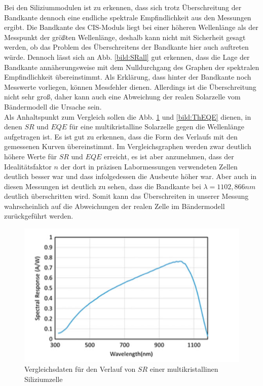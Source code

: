 \clearpage

Bei den Siliziummodulen ist zu erkennen, dass sich trotz 
Überschreitung der Bandkante dennoch eine endliche spektrale Empfindlichkeit aus den Messungen ergibt. 
Die Bandkante des CIS-Moduls liegt bei einer höheren Wellenlänge als der Messpunkt der größten Wellenlänge, deshalb kann nicht mit 
Sicherheit gesagt werden, ob das Problem des Überschreitens der Bandkante hier auch auftreten würde. Dennoch lässt sich an Abb. 
\ref{bild:SRall} gut erkennen, dass die Lage der Bandkante annäherungsweise mit dem Nulldurchgang des Graphen der spektralen Empfindlichkeit
übereinstimmt. Als Erklärung, dass hinter der Bandkante noch Messwerte vorliegen, können Messfehler dienen. Allerdings ist die 
Überschreitung nicht sehr groß, daher kann auch eine Abweichung der realen Solarzelle vom Bändermodell die Ursache sein. \\


Als Anhaltspunkt zum Vergleich sollen die Abb. \ref{bild:ThSR} und \ref{bild:ThEQE} dienen, in denen $SR$ und $EQE$ für eine multikristalline Solarzelle 
gegen die Wellenlänge aufgetragen ist. Es ist gut zu erkennen, dass die Form des Verlaufs mit den gemessenen Kurven übereinstimmt. Im 
Vergleichsgraphen werden zwar deutlich höhere Werte für $SR$ und $EQE$ erreicht, es ist aber anzunehmen, dass der Idealitätsfaktor $n$ 
der dort in präzisen Labormessungen verwendeten Zellen deutlich besser war und dass infolgedessen die Ausbeute höher war.
Aber auch in diesen Messungen ist deutlich zu sehen, dass die Bandkante bei $\lambda = 1102,866 nm$ deutlich überschritten wird. Somit
kann das Überschreiten in unserer Messung wahrscheinlich auf die Abweichungen der realen Zelle im Bändermodell zurückgeführt werden.

\begin{figure}[ht]
    \centering
    \includegraphics[scale=0.75]{Bilder/TheorieSR.png}
    \caption{Vergleichsdaten für den Verlauf von $SR$ einer multikristallinen Siliziumzelle \protect \footnotemark}
    \label{bild:ThSR}
\end{figure}

